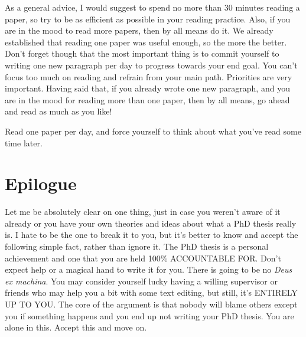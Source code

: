 \documentclass[
  12pt,
]{book}
\begin{document}
As a general advice, I would suggest to spend no more than 30 minutes reading a paper, so try to be as efficient as possible in your reading practice.
Also, if you are in the mood to read more papers, then by all means do it.
We already established that reading one paper was useful enough, so the more the better.
Don't forget though that the most important thing is to commit yourself to writing one new paragraph per day to progress towards your end goal.
You can't focus too much on reading and refrain from your main path.
Priorities are very important.
Having said that, if you already wrote one new paragraph, and you are in the mood for reading more than one paper, then by all means, go ahead and read as much as you like!

Read one paper per day, and force yourself to think about what you've read some time later.

\hypertarget{epilogue}{%
\chapter*{Epilogue}\label{epilogue}}

\indent

Let me be absolutely clear on one thing, just in case you weren't aware of it already or you have your own theories and ideas about what a PhD thesis really is.
I hate to be the one to break it to you, but it's better to know and accept the following simple fact, rather than ignore it.
The PhD thesis is a personal achievement and one that you are held 100\% ACCOUNTABLE FOR.
Don't expect help or a magical hand to write it for you.
There is going to be no \emph{Deus ex machina}.
You may consider yourself lucky having a willing supervisor or friends who may help you a bit with some text editing, but still, it's ENTIRELY UP TO YOU.
The core of the argument is that nobody will blame others except you if something happens and you end up not writing your PhD thesis.
You are alone in this.
Accept this and move on.
\end{document}
